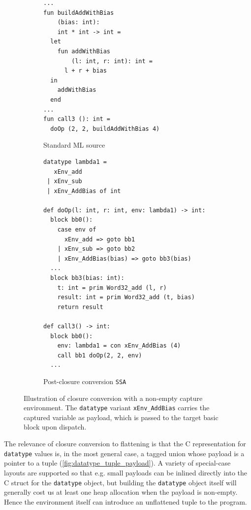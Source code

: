 \begin{figure}[!htb]
  \centering
  \begin{subfigure}[t]{0.42\textwidth}
    \caption{Standard ML source}
    \label{fig:hofo_env_example_sml}
    \vspace{1mm}
\begin{verbatim}
...
fun buildAddWithBias
    (bias: int):
    int * int -> int =
  let
    fun addWithBias
        (l: int, r: int): int =
      l + r + bias
  in
    addWithBias
  end
...
fun call3 (): int =
  doOp (2, 2, buildAddWithBias 4)
\end{verbatim}
  \end{subfigure}\hfill
  \begin{subfigure}[t]{0.56\textwidth}
    \caption{Post-closure conversion \texttt{SSA}}
    \label{fig:hofo_env_example_ssa}
    \vspace{1mm}
\begin{verbatim}
datatype lambda1 =
   xEnv_add
 | xEnv_sub
 | xEnv_AddBias of int

def doOp(l: int, r: int, env: lambda1) -> int:
  block bb0():
    case env of
      xEnv_add => goto bb1
    | xEnv_sub => goto bb2
    | xEnv_AddBias(bias) => goto bb3(bias)
  ...
  block bb3(bias: int):
    t: int = prim Word32_add (l, r)
    result: int = prim Word32_add (t, bias)
    return result

def call3() -> int:
  block bb0():
    env: lambda1 = con xEnv_AddBias (4)
    call bb1 doOp(2, 2, env)
  ...
\end{verbatim}
  \end{subfigure}
  \caption{Illustration of closure conversion with a non-empty capture
    environment. The \texttt{datatype} variant \texttt{xEnv\_AddBias} carries
    the captured variable as payload, which is passed to the target basic block
    upon dispatch.}
  \label{fig:hofo_env_example}
\end{figure}
\FloatBarrier

The relevance of closure conversion to flattening is that the C representation
for \texttt{datatype} values is, in the most general case, a tagged union whose
payload is a pointer to a tuple (\cref{fig:datatype_tuple_payload}). A variety
of special-case layouts are supported so that e.g. small payloads can be inlined
directly into the C struct for the \texttt{datatype} object, but building the
\texttt{datatype} object itself will generally cost us at least one heap
allocation when the payload is non-empty. Hence the environment itself can
introduce an unflattened tuple to the program.

